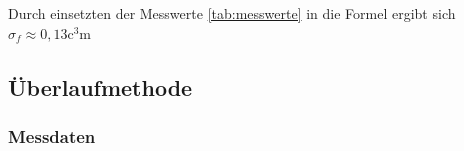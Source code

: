 Durch einsetzten der Messwerte \ref{tab:messwerte} in die Formel ergibt sich $ \sigma_f \approx 0,13 \unit{\cubic\centi\meter} $ 

\subsection{Überlaufmethode}
\subsubsection*{Messdaten}

